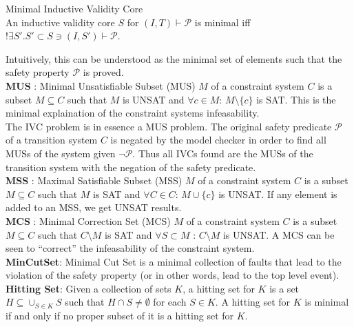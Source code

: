 \begin{definition}Minimal Inductive Validity Core\\
An inductive validity core $S$ for $(I,T) \vdash \mathcal{P}$ is minimal iff $! \exists S' . S' \subset S \ni (I,S') \vdash \mathcal{P}$. \\
\end{definition}

Intuitively, this can be understood as the minimal set of elements such that the safety property $\mathcal{P}$ is proved. \\

\textbf{MUS} : Minimal Unsatisfiable Subset (MUS) $M$ of a constraint system $C$ is a subset $M \subseteq C$ such that $M$ is UNSAT and $\forall c \in M$: $M \setminus \{c\}$ is SAT. This is the minimal explaination of the constraint systems infeasability. \\

The IVC problem is in essence a MUS problem. The original safety predicate $\mathcal{P}$ of a transition system $C$ is negated by the model checker in order to find all MUSs of the system given $\neg \mathcal{P}$. Thus all IVCs found are the MUSs of the transition system with the negation of the safety predicate.\\

\textbf{MSS} : Maximal Satisfiable Subset (MSS) $M$ of a constraint system $C$ is a subset $M \subseteq C$ such that $M$ is SAT and $\forall C \in C$: $M \cup \{c\}$ is UNSAT. If any element is added to an MSS, we get UNSAT results. \\

\textbf{MCS} : Minimal Correction Set (MCS) $M$ of a constraint system $C$ is a subset $M \subseteq C$ such that $C \setminus M$ is SAT and $\forall S \subset M$ : $C \setminus M$ is UNSAT. A MCS can be seen to ``correct'' the infeasability of the constraint system.\\

\textbf{MinCutSet}: Minimal Cut Set is a minimal collection of faults that lead to the violation of the safety property (or in other words, lead to the top level event). \\

\textbf{Hitting Set}: Given a collection of sets $K$, a hitting set for $K$ is a set $H \subseteq \cup_{S \in K} S$ such that $H \cap S \neq \emptyset$ for each $S  \in K$. A hitting set for $K$ is minimal if and only if no proper subset of it is a hitting set for $K$. \\

